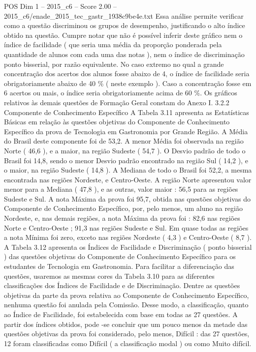 \begin{textsample}{POS Dim 1 – 2015\_c6 – Score 2.00 – 2015\_c6/enade\_2015\_tec\_gastr\_1938c9be4e.txt}
Essa análise permite verificar como a questão discriminou os grupos de desempenho, justificando o alto índice obtido na questão.
Cumpre notar que não é possível inferir deste gráfico nem o índice de facilidade ( que seria uma média da proporção ponderada pela quantidade de alunos com cada uma das notas ), nem o índice de discriminação ponto bisserial, por razão equivalente.
No caso extremo no qual a grande concentração dos acertos dos alunos fosse abaixo de 4, o índice de facilidade seria obrigatoriamente abaixo de 40 \% ( neste exemplo ).
Caso a concentração fosse em 6 acertos ou mais, o índice seria obrigatoriamente acima de 60 \%.
Os gráficos relativos às demais questões de Formação Geral constam do Anexo I. 3.2.2 Componente de Conhecimento Específico A Tabela 3.11 apresenta as Estatísticas Básicas em relação às questões objetivas do Componente de Conhecimento Específico da prova de Tecnologia em Gastronomia por Grande Região.
A Média do Brasil deste componente foi de 53,2.
A menor Média foi observada na região Norte ( 46,6 ), e a maior, na região Sudeste ( 54,7 ).
O Desvio padrão de todo o Brasil foi 14,8, sendo o menor Desvio padrão encontrado na região Sul ( 14,2 ), e o maior, na região Sudeste ( 14,8 ).
A Mediana de todo o Brasil foi 52,2, a mesma encontrada nas regiões Nordeste, e Centro-Oeste.
A região Norte apresentou valor menor para a Mediana ( 47,8 ), e as outras, valor maior : 56,5 para as regiões Sudeste e Sul.
A nota Máxima da prova foi 95,7, obtida nas questões objetivas do Componente de Conhecimento Específico, por, pelo menos, um aluno na região Nordeste, e, nas demais regiões, a nota Máxima da prova foi : 82,6 nas regiões Norte e Centro-Oeste ; 91,3 nas regiões Sudeste e Sul.
Em quase todas as regiões a nota Mínima foi zero, exceto nas regiões Nordeste ( 4,3 ) e Centro-Oeste ( 8,7 ).
A Tabela 3.12 apresenta os Índices de Facilidade e Discriminação ( ponto bisserial ) das questões objetivas do Componente de Conhecimento Específico para os estudantes de Tecnologia em Gastronomia.
Para facilitar a diferenciação das questões, usaremos as mesmas cores da Tabela 3.10 para as diferentes classificações dos Índices de Facilidade e de Discriminação.
Dentre as questões objetivas da parte da prova relativa ao Componente de Conhecimento Específico, nenhuma questão foi anulada pela Comissão.
Desse modo, a classificação, quanto ao Índice de Facilidade, foi estabelecida com base em todas as 27 questões.
A partir dos índices obtidos, pode -se concluir que um pouco menos da metade das questões objetivas da prova foi considerado, pelo menos, Difícil : das 27 questões, 12 foram classificadas como Difícil ( a classificação modal ) ou como Muito difícil.

\end{textsample}

